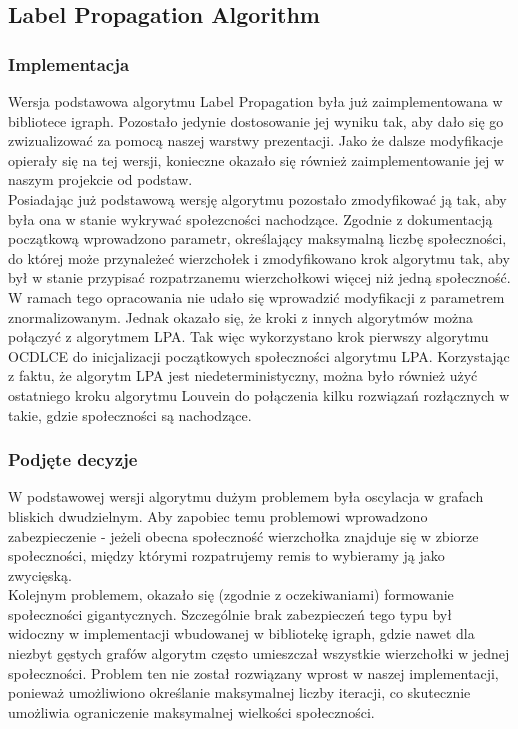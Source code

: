 \documentclass{article}
\begin{document}
\subsection{Label Propagation Algorithm}
\subsubsection{Implementacja}

Wersja podstawowa algorytmu Label Propagation była już zaimplementowana w bibliotece igraph. Pozostało jedynie dostosowanie jej wyniku tak, aby dało się go zwizualizować za pomocą naszej warstwy prezentacji. Jako że dalsze modyfikacje opierały się na tej wersji, konieczne okazało się również zaimplementowanie jej w naszym projekcie od podstaw.\\

Posiadając już podstawową wersję algorytmu pozostało zmodyfikować ją tak, aby była ona w stanie wykrywać społezcności nachodzące. Zgodnie z dokumentacją początkową wprowadzono parametr, określający maksymalną liczbę społeczności, do której może przynależeć wierzchołek i zmodyfikowano krok algorytmu tak, aby był w stanie przypisać rozpatrzanemu wierzchołkowi więcej niż jedną społeczność.\\

W ramach tego opracowania nie udało się wprowadzić modyfikacji z parametrem znormalizowanym. Jednak okazało się, że kroki z innych algorytmów można połączyć z algorytmem LPA. Tak więc wykorzystano krok pierwszy algorytmu OCDLCE do inicjalizacji początkowych społeczności algorytmu LPA. Korzystając z faktu, że algorytm LPA jest niedeterministyczny, można było również użyć ostatniego kroku algorytmu Louvein do połączenia kilku rozwiązań rozłącznych w takie, gdzie społeczności są nachodzące.

\subsubsection{Podjęte decyzje}

W podstawowej wersji algorytmu dużym problemem była oscylacja w grafach bliskich dwudzielnym. Aby zapobiec temu problemowi wprowadzono zabezpieczenie - jeżeli obecna społeczność wierzchołka znajduje się w zbiorze społeczności, między którymi rozpatrujemy remis to wybieramy ją jako zwycięską.\\

Kolejnym problemem, okazało się (zgodnie z oczekiwaniami) formowanie społeczności gigantycznych. Szczególnie brak zabezpieczeń tego typu był widoczny w implementacji wbudowanej w bibliotekę igraph, gdzie nawet dla niezbyt gęstych grafów algorytm często umieszczał wszystkie wierzchołki w jednej społeczności. Problem ten nie został rozwiązany wprost w naszej implementacji, ponieważ umożliwiono określanie maksymalnej liczby iteracji, co skutecznie umożliwia ograniczenie maksymalnej wielkości społeczności.
\end{document}
